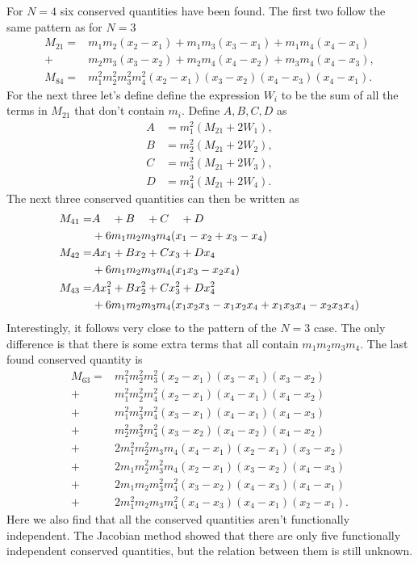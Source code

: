 \documentclass[english,master]{liumaiex}
\theoremstyle{plain}
\theoremstyle{definition}
\begin{document}
For $N = 4$ six conserved quantities have been found. The first two follow the same pattern as for $N = 3$
\begin{align}
	M_{21} = &m_1 m_2 (x_2 - x_1) + m_1 m_3 (x_3 - x_1) + m_1 m_4 (x_4 - x_1) \\ +  &m_2 m_3 (x_3 - x_2) + m_2 m_4 (x_4 - x_2) + m_3 m_4 (x_4 - x_3),\\
	M_{84} = &m_1^2m_2^2m_3^2m_4^2(x_2 - x_1)(x_3 - x_2)(x_4 - x_3)(x_4 - x_1).
\end{align}
For the next three let's define define the expression $W_i$ to be the sum of all the terms in $M_{21}$ that don't contain $m_i$. Define $A, B, C, D$ as
\begin{align}
	A &= m_1^2(M_{21} + 2W_1), \\
	B &= m_2^2(M_{21} + 2W_2), \\
	C &= m_3^2(M_{21} + 2W_3), \\
	D &= m_4^2(M_{21} + 2W_4).
\end{align}
The next  three conserved quantities can then be written as
\begin{align}
	M_{41} =& A\phantom{x_1} + B\phantom{x_2} + C\phantom{x_3} + D\phantom{x_4} \notag \\
	&+ 6m_1m_2m_3m_4 (x_1 - x_2 + x_3 - x_4) \\
	M_{42} =& Ax_1 + Bx_2 + Cx_3 + Dx_4 \notag \\
	&+ 6m_1m_2m_3m_4 (x_1x_3 - x_2x_4) \\
	M_{43} =& Ax_1^2 + Bx_2^2 + Cx_3^2 + Dx_4^2 \notag \\
	&+ 6m_1m_2m_3m_4 (x_1x_2x_3 - x_1x_2x_4 + x_1x_3x_4 - x_2x_3x_4)
\end{align}
%
Interestingly, it follows very close to the pattern of the $N = 3$ case. The only difference is that there is some extra terms that all contain $m_1m_2m_3m_4$. The last found conserved quantity is
\begin{equation}
\begin{aligned}
	M_{63} =
		 &m_1^2m_2^2m_3^2(x_2 - x_1)(x_3 - x_1)(x_3 - x_2) \\
		+&m_1^2m_2^2m_4^2(x_2 - x_1)(x_4 - x_1)(x_4 - x_2) \\
		+&m_1^2m_3^2m_4^2(x_3 - x_1)(x_4 - x_1)(x_4 - x_3) \\
		+&m_2^2m_3^2m_4^2(x_3 - x_2)(x_4 - x_2)(x_4 - x_2) \\
		+&2m_1^2m_2^2m_3m_4(x_4 - x_1)(x_2 - x_1)(x_3 - x_2) \\
		+&2m_1m_2^2m_3^2m_4(x_2 - x_1)(x_3 - x_2)(x_4 - x_3) \\
		+&2m_1m_2m_3^2m_4^2(x_3 - x_2)(x_4 - x_3)(x_4 - x_1) \\
		+&2m_1^2m_2m_3m_4^2(x_4 - x_3)(x_4 - x_1)(x_2 - x_1).
\end{aligned}
\end{equation}
Here we also find that all the conserved quantities aren't functionally independent. The Jacobian method showed that there are only five functionally independent conserved quantities, but the relation between them is still unknown.
\end{document}
